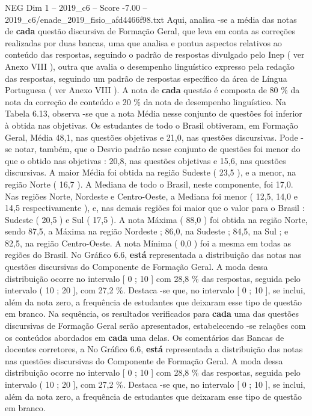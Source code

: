 \begin{textsample}{NEG Dim 1 – 2019\_c6 – Score -7.00 – 2019\_c6/enade\_2019\_fisio\_afd4466f98.txt}
Aqui, analisa -se a média das notas de \textbf{cada} questão discursiva de Formação Geral, que leva em conta as correções realizadas por duas bancas, uma que analisa e pontua aspectos relativos ao conteúdo das respostas, seguindo o padrão de respostas divulgado pelo Inep ( ver Anexo VIII ), outra que avalia o desempenho linguístico expresso pela redação das respostas, seguindo um padrão de respostas específico da área de Língua Portuguesa ( ver Anexo VIII ).
A nota de \textbf{cada} questão é composta de 80 \% da nota da correção de conteúdo e 20 \% da nota de desempenho linguístico.
Na Tabela 6.13, observa -se que a nota Média nesse conjunto de questões foi inferior à obtida nas objetivas.
Os estudantes de todo o Brasil obtiveram, em Formação Geral, Média 48,1, nas questões objetivas e 21,0, nas questões discursivas.
Pode -se notar, também, que o Desvio padrão nesse conjunto de questões foi menor do que o obtido nas objetivas : 20,8, nas questões objetivas e 15,6, nas questões discursivas.
A maior Média foi obtida na região Sudeste ( 23,5 ), e a menor, na região Norte ( 16,7 ).
A Mediana de todo o Brasil, neste componente, foi 17,0.
Nas regiões Norte, Nordeste e Centro-Oeste, a Mediana foi menor ( 12,5, 14,0 e 14,5 respectivamente ), e, nas demais regiões foi maior que o valor para o Brasil : Sudeste ( 20,5 ) e Sul ( 17,5 ).
A nota Máxima ( 88,0 ) foi obtida na região Norte, sendo 87,5, a Máxima na região Nordeste ; 86,0, na Sudeste ; 84,5, na Sul ; e 82,5, na região Centro-Oeste.
A nota Mínima ( 0,0 ) foi a mesma em todas as regiões do Brasil.
No Gráfico 6.6, \textbf{está} representada a distribuição das notas nas questões discursivas do Componente de Formação Geral.
A moda dessa distribuição ocorre no intervalo [ 0 ; 10 ] com 28,8 \% das respostas, seguida pelo intervalo ( 10 ; 20 ], com 27,2 \%.
Destaca -se que, no intervalo [ 0 ; 10 ], se inclui, além da nota zero, a frequência de estudantes que deixaram esse tipo de questão em branco.
Na sequência, os resultados verificados para \textbf{cada} uma das questões discursivas de Formação Geral serão apresentados, estabelecendo -se relações com os conteúdos abordados em \textbf{cada} uma delas.
Os comentários das Bancas de docentes corretores, a No Gráfico 6.6, \textbf{está} representada a distribuição das notas nas questões discursivas do Componente de Formação Geral.
A moda dessa distribuição ocorre no intervalo [ 0 ; 10 ] com 28,8 \% das respostas, seguida pelo intervalo ( 10 ; 20 ], com 27,2 \%.
Destaca -se que, no intervalo [ 0 ; 10 ], se inclui, além da nota zero, a frequência de estudantes que deixaram esse tipo de questão em branco.

\end{textsample}
